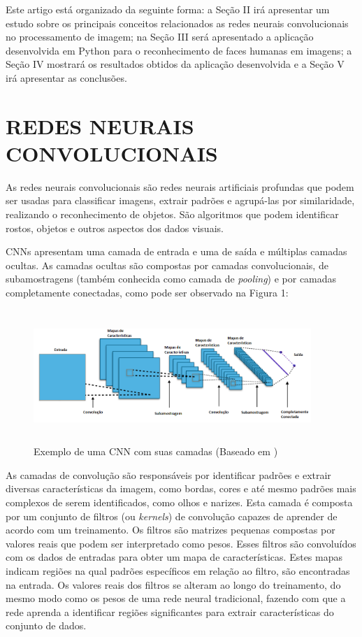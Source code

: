 \documentclass[conference]{IEEEtran}
\begin{document}
		Este artigo está organizado da seguinte forma: a Seção II irá apresentar um estudo sobre os principais conceitos relacionados as redes neurais convolucionais no processamento de imagem; na Seção III será apresentado a aplicação desenvolvida em Python para o reconhecimento de faces humanas em imagens; a Seção IV mostrará os resultados obtidos da aplicação desenvolvida e a Seção V irá apresentar as conclusões.   
		
	 \section{REDES NEURAIS CONVOLUCIONAIS}
		As redes neurais convolucionais são redes neurais artificiais profundas que podem ser usadas para classificar imagens, extrair padrões e agrupá-las por similaridade, realizando o reconhecimento de objetos. São algoritmos que podem identificar rostos, objetos e outros aspectos dos dados visuais.

        CNNs apresentam uma camada de entrada e uma de saída e múltiplas camadas ocultas. As camadas ocultas são compostas por camadas convolucionais, de subamostragens (também conhecida como camada de \textit{pooling}) e por camadas completamente conectadas, como pode ser observado na Figura 1:
        
		\begin{figure}[h!b]
			\centering \includegraphics[width=10.5cm,height=5cm]{CNN}
			\caption{Exemplo de uma CNN com suas camadas (Baseado em \cite{b1})} 
		\end{figure}
		
		As camadas de convolução são responsáveis por identificar padrões e extrair diversas características da imagem, como bordas, cores e até mesmo padrões mais complexos de serem identificados, como olhos e narizes.  Esta camada é composta por um conjunto de filtros (ou \textit{kernels}) de convolução capazes de aprender de acordo com um treinamento. Os filtros são matrizes pequenas compostas por valores reais que podem ser interpretado como pesos. Esses filtros são convoluídos com os dados de entradas para obter um mapa de características. Estes mapas indicam regiões na qual padrões específicos em relação ao filtro, são encontradas na entrada. Os valores reais dos filtros se alteram ao longo do treinamento, do mesmo modo como os pesos de uma rede neural tradicional, fazendo com que a rede aprenda a identificar regiões significantes para extrair características do conjunto de dados.
		
\end{document}
